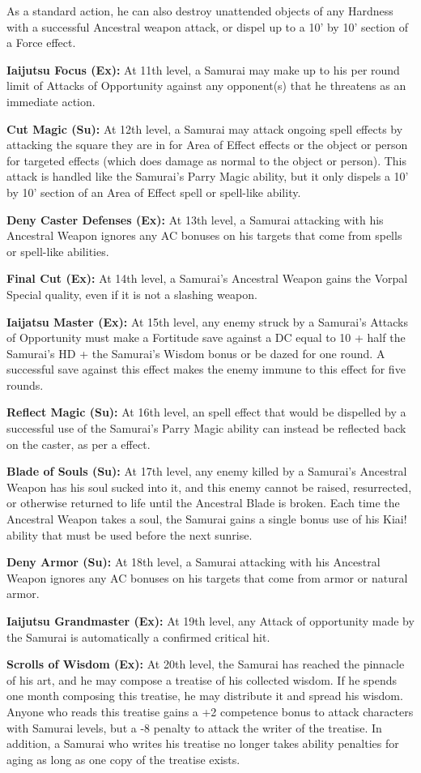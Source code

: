 As a standard action, he can also destroy unattended objects of any Hardness with a successful Ancestral weapon attack, or dispel up to a 10' by 10' section of a Force effect.

\textbf{Iaijutsu Focus (Ex):} At 11th level, a Samurai may make up to his per round limit of Attacks of Opportunity against any opponent(s) that he threatens as an immediate action. 

\textbf{Cut Magic (Su):} At 12th level, a Samurai may attack ongoing spell effects by attacking the square they are in for Area of Effect effects or the object or person for targeted effects (which does damage as normal to the object or person). This attack is handled like the Samurai's Parry Magic ability, but it only dispels a 10' by 10' section of an Area of Effect spell or spell-like ability.

\textbf{Deny Caster Defenses (Ex):} At 13th level, a Samurai attacking with his Ancestral Weapon ignores any AC bonuses on his targets that come from spells or spell-like abilities.

\textbf{Final Cut (Ex):} At 14th level, a Samurai's Ancestral Weapon gains the Vorpal Special quality, even if it is not a slashing weapon. 

\textbf{Iaijatsu Master (Ex):} At 15th level, any enemy struck by a Samurai's Attacks of Opportunity must make a Fortitude save against a DC equal to 10 + half the Samurai's HD + the Samurai's Wisdom bonus or be dazed for one round. A successful save against this effect makes the enemy immune to this effect for five rounds. 

\textbf{Reflect Magic (Su):} At 16th level, an spell effect that would be dispelled by a successful use of the Samurai's Parry Magic ability can instead be reflected back on the caster, as per a  effect. 

\textbf{Blade of Souls (Su):} At 17th level, any enemy killed by a Samurai's Ancestral Weapon has his soul sucked into it, and this enemy cannot be raised, resurrected, or otherwise returned to life until the Ancestral Blade is broken. Each time the Ancestral Weapon takes a soul, the Samurai gains a single bonus use of his Kiai! ability that must be used before the next sunrise.

\textbf{Deny Armor (Su):} At 18th level, a Samurai attacking with his Ancestral Weapon ignores any AC bonuses on his targets that come from armor or natural armor.

\textbf{Iaijutsu Grandmaster (Ex):} At 19th level, any Attack of opportunity made by the Samurai is automatically a confirmed critical hit.

\textbf{Scrolls of Wisdom (Ex):} At 20th level, the Samurai has reached the pinnacle of his art, and he may compose a treatise of his collected wisdom. If he spends one month composing this treatise, he may distribute it and spread his wisdom. Anyone who reads this treatise gains a +2 competence bonus to attack characters with Samurai levels, but a -8 penalty to attack the writer of the treatise. In addition, a Samurai who writes his treatise no longer takes ability penalties for aging as long as one copy of the treatise exists. 
